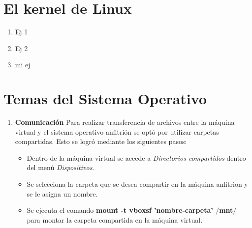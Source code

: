 \documentclass[a4paper,11pt] {article}
\begin{document}
\section*{El kernel de Linux}
	\begin{enumerate}
		\item Ej 1
		\item Ej 2
		\item mi ej
	\end{enumerate}

\section*{Temas del Sistema Operativo}

\begin{enumerate}
  \item \textbf{Comunicaci\'on}
    Para realizar transferencia de archivos entre la m\'aquina virtual y el sistema operativo anfitri\'on se opt\'o por utilizar carpetas compartidas. Esto se logr\'o mediante los siguientes pasos:
    \begin{itemize}
      \item Dentro de la m\'aquina virtual se accede a \textit{Directorios compartidos} dentro del men\'u \textit{Dispositivos}.
      \item Se selecciona la carpeta que se desea compartir en la m\'aquina anfitrion y se le asigna un nombre.
      \item Se ejecuta el comando \textbf{mount -t vboxsf 'nombre-carpeta' $/$mnt$/$} para montar la carpeta compartida en la m\'aquina virtual.
    \end{itemize}


\end{enumerate}
\end{document}
